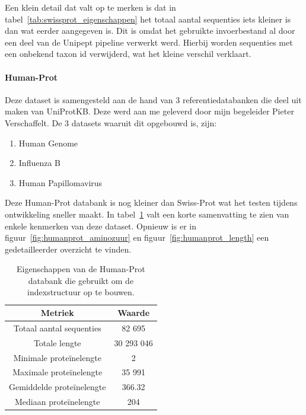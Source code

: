 \documentclass[11pt,dutch,faculty=we,layout=titlefont,underline=false,titleUppercase=true,titleUnderline=true]{ugent2016-report}
\begin{document}
    Een klein detail dat valt op te merken is dat in tabel~\ref{tab:swissprot_eigenschappen} het totaal aantal sequenties iets kleiner is dan wat eerder aangegeven is.
    Dit is omdat het gebruikte invoerbestand al door een deel van de Unipept pipeline verwerkt werd.
    Hierbij worden sequenties met een onbekend taxon id verwijderd, wat het kleine verschil verklaart.

    \paragraph{Human-Prot} Deze dataset is samengesteld aan de hand van 3 referentiedatabanken die deel uit maken van UniProtKB\@.
    Deze werd aan me geleverd door mijn begeleider Pieter Verschaffelt.
    De 3 datasets waaruit dit opgebouwd is, zijn:
    \begin{enumerate}
        \item Human Genome~\cite{proteomes_homo_sapiens}
        \item Influenza B~\cite{proteomes_infuenza_b}
        \item Human Papillomavirus~\cite{proteomes_human_papillomavirus}
    \end{enumerate}

    Deze Human-Prot databank is nog kleiner dan Swiss-Prot wat het testen tijdens ontwikkeling sneller maakt.
    In tabel~\ref{tab:humanprot_eigenschappen} valt een korte samenvatting te zien van enkele kenmerken van deze dataset.
    Opnieuw is er in figuur~\ref{fig:humanprot_aminozuur} en figuur~\ref{fig:humanprot_length} een gedetailleerder overzicht te vinden.

    \begin{table}[h!]
        \centering
        \begin{tabular}{ c c }
            Metriek                   & Waarde     \\
            \hline\hline
            Totaal aantal sequenties  & 82 695     \\
            Totale lengte             & 30 293 046 \\
            Minimale proteïnelengte   & 2          \\
            Maximale proteïnelengte   & 35 991     \\
            Gemiddelde proteïnelengte & 366.32     \\
            Mediaan proteïnelengte    & 204        \\
            \hline
        \end{tabular}
        \caption{Eigenschappen van de Human-Prot databank die gebruikt om de indexstructuur op te bouwen.}
        \label{tab:humanprot_eigenschappen}
    \end{table}
\end{document}
